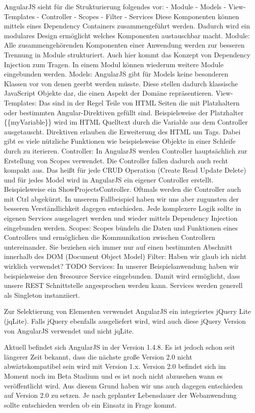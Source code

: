 \documentclass[]{article}
\begin{document}
AngularJS sieht für die Strukturierung folgendes vor: - Module - Models
- View-Templates - Controller - Scopes - Filter - Services Diese
Komponenten können mittels eines Dependency Containers zusammengeführt
werden. Dadurch wird ein modulares Design ermöglicht welches Komponenten
austauschbar macht. Module: Alle zusammengehörenden Komponenten einer
Anwendung werden zur besseren Trennung in Module strukturiert. Auch hier
kommt das Konzept von Dependency Injection zum Tragen. In einem Modul
können wiederum weitere Module eingebunden werden. Models: AngularJS
gibt für Models keine besonderen Klassen vor von denen geerbt werden
müsste. Diese stellen dadurch klassische JavaScript Objekte dar, die
einen Aspekt der Domäne repräsentieren. View-Templates: Das sind in der
Regel Teile von HTML Seiten die mit Platzhaltern oder bestimmten
Angular-Direktiven gefüllt sind. Beispielsweise der Platzhalter
\{\{myVariable\}\} wird im HTML Quelltext durch die Variable aus dem
Controller ausgetauscht. Direktiven erlauben die Erweiterung des HTML um
Tags. Dabei gibt es viele nützliche Funktionen wie beispielsweise
Objekte in einer Schleife durch zu iterieren. Controller: In AngularJS
werden Controller hauptsächlich zur Erstellung von Scopes verwendet. Die
Controller fallen dadurch auch recht kompakt aus. Das heißt für jede
CRUD Operation (Create Read Update Delete) und für jedes Model wird in
AngularJS ein eigener Controller erstellt. Beispielsweise ein
ShowProjectsController. Oftmals werden die Controller auch mit Ctrl
abgekürzt. In unserem Fallbeispiel haben wir uns aber zugunsten der
besseren Verständlichkeit dagegen entschieden. Jede komplexere Logik
sollte in eigenen Services ausgelagert werden und wieder mittels
Dependency Injection eingebunden werden. Scopes: Scopes bündeln die
Daten und Funktionen eines Controllers und ermöglichen die Kommunikation
zwischen Controllern untereinander. Sie beziehen sich immer nur auf
einen bestimmten Abschnitt innerhalb des DOM (Document Object Model)
Filter: Haben wir glaub ich nicht wirklich verwendet? TODO Services: In
unserer Beispielanwendung haben wir beispielsweise den \$resource
Service eingebunden. Damit wird ermöglicht, dass unsere REST
Schnittstelle angesprochen werden kann. Services werden generell als
Singleton instanziiert.

Zur Selektierung von Elementen verwendet AngularJS ein integriertes
jQuery Lite (jqLite). Falls jQuery ebenfalls ausgeliefert wird, wird
auch diese jQuery Version von AngularJS verwendet und nicht jqLite.

Aktuell befindet sich AngularJS in der Version 1.4.8. Es ist jedoch
schon seit längerer Zeit bekannt, dass die nächste große Version 2.0
nicht abwärtskompatibel sein wird mit Version 1.x. Version 2.0 befindet
sich im Moment noch im Beta Stadium und es ist noch nicht abzusehen wann
es veröffentlicht wird. Aus diesem Grund haben wir uns auch dagegen
entschieden auf Version 2.0 zu setzen. Je nach geplanter Lebensdauer der
Webanwendung sollte entschieden werden ob ein Einsatz in Frage kommt.
\end{document}
